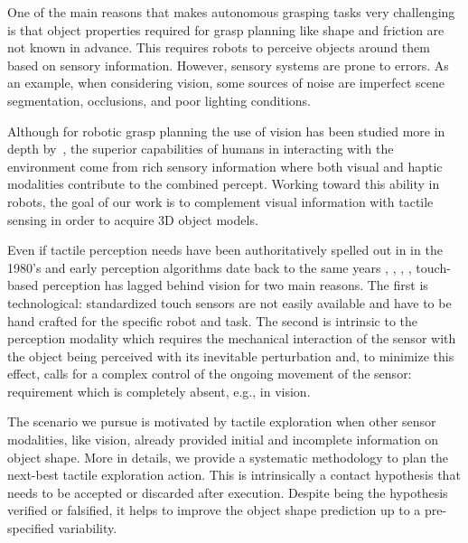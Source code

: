 
One of the main reasons that makes autonomous grasping tasks very challenging is that object properties required for grasp planning like shape and friction are not known %
in advance.
This requires robots to perceive objects around them based on sensory information. However, sensory systems are prone to errors. As an example, when considering vision, some sources of noise are imperfect scene segmentation, occlusions, and poor lighting conditions.

Although for robotic grasp planning the use of vision has been studied more in depth by~\cite{Kragic2002TechRep}, the superior capabilities of humans in interacting with the environment come from rich sensory information where both visual and haptic modalities contribute to the combined percept. Working toward this ability in robots, the goal of our work is to complement visual information with tactile sensing in order to acquire 3D object models.

Even if tactile perception needs have been authoritatively spelled out in \cite{Bajcsy1988Active} in the 1980's and early perception algorithms date back to the same years \cite{Grimson1984JRR}, \cite{Faugeras1983IJCAI}, \cite{Shekhar1986ICRA}, \cite{Bajcsy1989Machine}, touch-based perception has lagged behind vision for two main reasons. The first is technological: standardized touch sensors are not easily available and have to be hand crafted for the specific robot and task. The second is intrinsic to the perception modality which requires the mechanical interaction of the sensor with the object being perceived with its inevitable perturbation and, to minimize this effect, calls for a complex control of the ongoing movement of the sensor: requirement which is completely absent, e.g., in vision.

The scenario we pursue is motivated by tactile exploration when other sensor modalities, like vision, already provided initial and incomplete information on object shape. More in details, we provide a systematic methodology to plan the next-best tactile exploration action. This is intrinsically a contact hypothesis that needs to be accepted or discarded after execution. Despite being the hypothesis verified or falsified, it helps to improve the object shape prediction up to a pre-specified variability.

